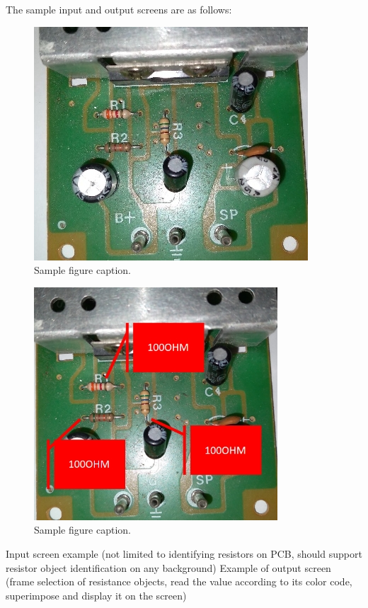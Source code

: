 \documentclass{article}
\begin{document}
The sample input and output screens are as follows:

\begin{figure}
	\centering
	\includegraphics[width=0.7\linewidth]{doc1.jpg}
	\caption{Sample figure caption.}
	\label{fig:doc1}
\end{figure}

\begin{figure}
	\centering
	\includegraphics[width=0.7\linewidth]{doc2.jpg}
	\caption{Sample figure caption.}
	\label{fig:doc2}
\end{figure}

Input screen example (not limited to identifying resistors on PCB, should support resistor object identification on any background)
Example of output screen (frame selection of resistance objects, read the value according to its color code, superimpose and display it on the screen)
\end{document}
